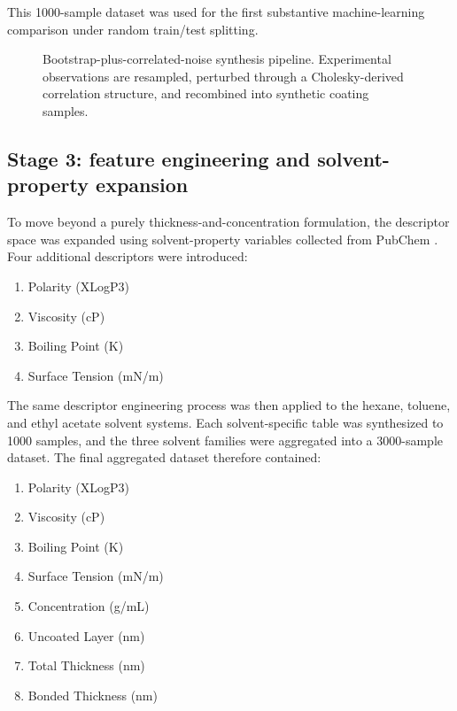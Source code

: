 \documentclass[11pt]{article}
\begin{document}
This 1000-sample dataset was used for the first substantive machine-learning comparison under random train/test splitting.

\begin{figure}[H]
\centering
{}
\caption{Bootstrap-plus-correlated-noise synthesis pipeline. Experimental observations are resampled, perturbed through a Cholesky-derived correlation structure, and recombined into synthetic coating samples.}
\end{figure}

\subsection{Stage 3: feature engineering and solvent-property expansion}
To move beyond a purely thickness-and-concentration formulation, the descriptor space was expanded using solvent-property variables collected from PubChem \cite{kim2023}. Four additional descriptors were introduced:
\begin{enumerate}
    \item Polarity (XLogP3)
    \item Viscosity (cP)
    \item Boiling Point (K)
    \item Surface Tension (mN/m)
\end{enumerate}

The same descriptor engineering process was then applied to the hexane, toluene, and ethyl acetate solvent systems. Each solvent-specific table was synthesized to 1000 samples, and the three solvent families were aggregated into a 3000-sample dataset. The final aggregated dataset therefore contained:
\begin{enumerate}
    \item Polarity (XLogP3)
    \item Viscosity (cP)
    \item Boiling Point (K)
    \item Surface Tension (mN/m)
    \item Concentration (g/mL)
    \item Uncoated Layer (nm)
    \item Total Thickness (nm)
    \item Bonded Thickness (nm)
\end{enumerate}
\end{document}
